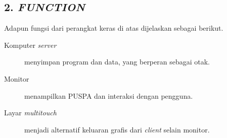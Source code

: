 \subsection*{\textcolor{subsectioncolor}{\textsf{2. \textit{FUNCTION}}}}

Adapun fungsi dari perangkat keras di atas dijelaskan sebagai berikut.
\begin{description}
\item[Komputer \textit{server}] menyimpan program dan data, yang berperan sebagai otak.
\item[Monitor] menampilkan PUSPA dan interaksi dengan pengguna.
\item[Layar \textit{multitouch}] menjadi alternatif keluaran grafis dari \textit{client} selain monitor.
\end{description}
